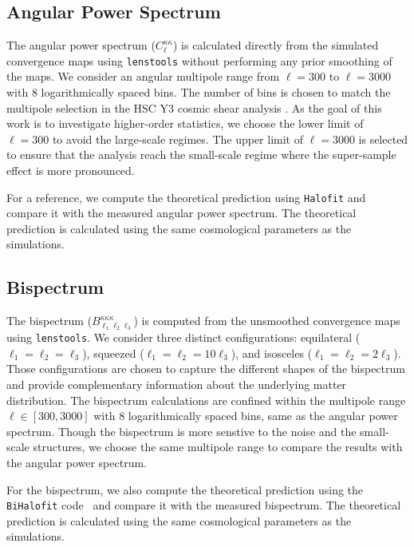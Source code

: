\subsection{Angular Power Spectrum}
The angular power spectrum ($C_{\ell}^{\kappa\kappa}$) is calculated directly from the simulated convergence maps using \texttt{lenstools} \citep{2016A&C....17...73P} without performing any prior smoothing of the maps. We consider an angular multipole range from $\ell = 300$ to $\ell = 3000$ with $8$ logarithmically spaced bins. The number of bins is chosen to match the multipole selection in the HSC Y3 cosmic shear analysis \citep{2023PhRvD.108l3519D}. As the goal of this work is to investigate higher-order statistics, we choose the lower limit of $\ell = 300$ to avoid the large-scale regimes. The upper limit of $\ell = 3000$ is selected to ensure that the analysis reach the small-scale regime where the super-sample effect is more pronounced.

For a reference, we compute the theoretical prediction using \texttt{Halofit} \citep{2012ApJ...761..152T} and compare it with the measured angular power spectrum. 
The theoretical prediction is calculated using the same cosmological parameters as the simulations. 

\subsection{Bispectrum}
The bispectrum ($B_{\ell_1\ell_2\ell_3}^{\kappa\kappa\kappa}$) is computed from the unsmoothed convergence maps using \texttt{lenstools}. We consider three distinct configurations: equilateral ($\ell_1 = \ell_2 = \ell_3$), squeezed ($\ell_1 = \ell_2 = 10\ell_3$), and isosceles ($\ell_1 = \ell_2 = 2\ell_3$). 
Those configurations are chosen to capture the different shapes of the bispectrum and provide complementary information about the underlying matter distribution.
The bispectrum calculations are confined within the multipole range $\ell \in [300, 3000]$ with $8$ logarithmically spaced bins, same as the angular power spectrum. Though the bispectrum is more senstive to the noise and the small-scale structures, we choose the same multipole range to compare the results with the angular power spectrum.

For the bispectrum, we also compute the theoretical prediction using the \texttt{BiHalofit} code~\citep{2020ApJ...895..113T} and compare it with the measured bispectrum. The theoretical prediction is calculated using the same cosmological parameters as the simulations.

